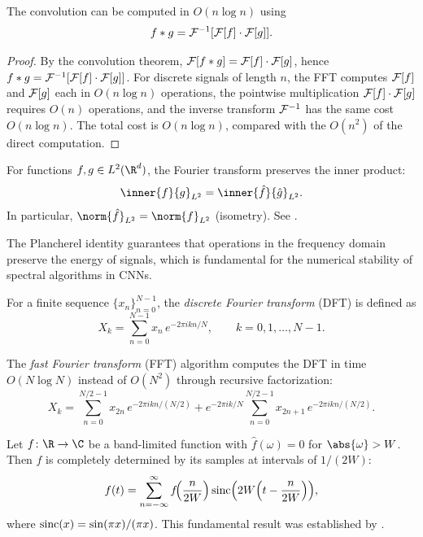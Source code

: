 \begin{corollary}
\label{cor:grids:fft}
The convolution can be computed in $O(n \log n)$ using
\[
  f * g = \mathcal{F}^{-1}[\mathcal{F}[f] \cdot \mathcal{F}[g]].
\]
\end{corollary}

\begin{proof}
By the convolution theorem, $\mathcal{F}[f * g] = \mathcal{F}[f] \cdot \mathcal{F}[g]$, hence
$f * g = \mathcal{F}^{-1}[\mathcal{F}[f] \cdot \mathcal{F}[g]]$. For discrete signals of length $n$,
the FFT computes $\mathcal{F}[f]$ and $\mathcal{F}[g]$ each in $O(n \log n)$ operations, the
pointwise multiplication $\mathcal{F}[f] \cdot \mathcal{F}[g]$ requires $O(n)$ operations, and
the inverse transform $\mathcal{F}^{-1}$ has the same cost $O(n \log n)$. The total cost
is $O(n \log n)$, compared with the $O(n^2)$ of the direct computation.
\end{proof}

\begin{theorem}
\label{thm:grids:plancherel}
For functions $f, g \in L^2(\R^d)$, the Fourier transform preserves the inner
product:
\[
  \inner{f}{g}_{L^2} = \inner{\hat{f}}{\hat{g}}_{L^2}.
\]
In particular, $\norm{\hat{f}}_{L^2} = \norm{f}_{L^2}$ (isometry). See
\citep[Theorem~8.29]{Folland1999}.
\end{theorem}

The Plancherel identity guarantees that operations in the frequency domain
preserve the energy of signals, which is fundamental for the numerical stability
of spectral algorithms in CNNs.

\begin{definition}
\label{def:grids:dft}
For a finite sequence $\{x_n\}_{n=0}^{N-1}$, the \emph{discrete Fourier
transform} (DFT) is defined as
\[
  X_k = \sum_{n=0}^{N-1} x_n\, e^{-2\pi i kn/N}, \qquad k = 0, 1, \ldots, N-1.
\]
\end{definition}

\begin{definition}
\label{def:grids:fft}
The \emph{fast Fourier transform} (FFT) algorithm computes the DFT in time
$O(N \log N)$ instead of $O(N^2)$ through recursive factorization:
\[
  X_k = \sum_{n=0}^{N/2-1} x_{2n}\, e^{-2\pi i kn/(N/2)}
   + e^{-2\pi i k/N} \sum_{n=0}^{N/2-1} x_{2n+1}\, e^{-2\pi i kn/(N/2)}.
\]
\end{definition}

\begin{theorem}
\label{thm:grids:nyquist}
Let $f \colon \R \to \C$ be a band-limited function with $\hat{f}(\omega) = 0$
for $\abs{\omega} > W$. Then $f$ is completely determined by its samples at
intervals of $1/(2W)$:
\[
  f(t) = \sum_{n=-\infty}^{\infty} f\!\Big(\frac{n}{2W}\Big)
    \operatorname{sinc}\!\Big(2W\Big(t - \frac{n}{2W}\Big)\Big),
\]
where $\operatorname{sinc}(x) = \sin(\pi x)/(\pi x)$. This fundamental result was established
by \citet{Shannon1948}.
\end{theorem}

